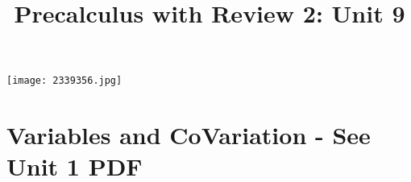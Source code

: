\documentclass[handout]{xourse}
\title{Precalculus with Review 2: Unit 9}
\begin{document}
\texttt{[image: 2339356.jpg]}
\maketitle


	





\part{Variables and CoVariation - See Unit 1 PDF}  %
%
%
%
%
%
%
%
%
\end{document}
